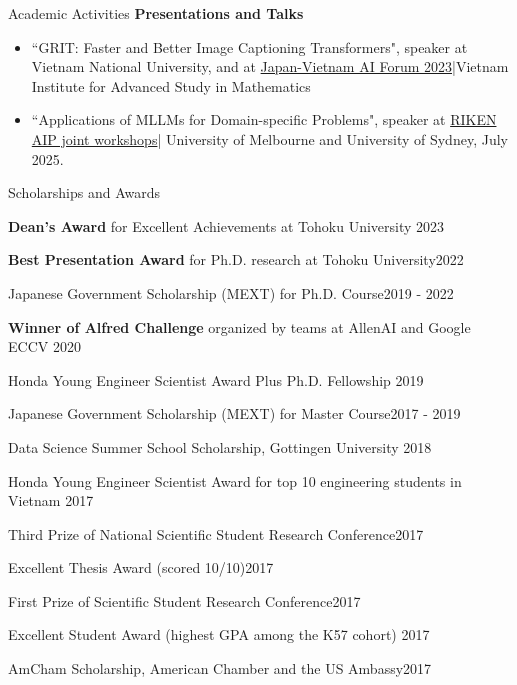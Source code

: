 \documentclass{resume} %
\begin{document}
\begin{rSection}{Academic Activities}
{\large \bf Presentations and Talks}
\begin{itemize}
    \item ``GRIT: Faster and Better Image Captioning Transformers", speaker at Vietnam National University, and at \href{https://viasm.edu.vn/en/hdkh/jvaif}{Japan-Vietnam AI Forum 2023}|Vietnam Institute for Advanced Study in Mathematics
    \item ``Applications of MLLMs for Domain-specific Problems", speaker at \href{https://sites.google.com/view/rikenaipjointworkshopsjuly2025}{RIKEN AIP joint workshops}|  University of Melbourne and University of Sydney, July 2025.
    
\end{itemize}
\end{rSection}

\begin{rSection}{Scholarships and Awards}
	\begin{enumerate}
	\item {\textbf{Dean's Award} for Excellent Achievements} at Tohoku University \hfill {2023}
	\item {\textbf{Best Presentation Award} for Ph.D. research at Tohoku University}\hfill {2022}
        \item {Japanese Government Scholarship (MEXT) for Ph.D. Course}\hfill {2019 - 2022}
        \item \textbf{Winner of Alfred Challenge} organized by teams at AllenAI and Google \hfill {ECCV 2020}
		\item {Honda Young Engineer Scientist Award Plus Ph.D. Fellowship} \hfill {2019}
        \item {Japanese Government Scholarship (MEXT) for Master Course}\hfill {2017 - 2019}
		\item {Data Science Summer School Scholarship, Gottingen University} \hfill {2018}
		\item {Honda Young Engineer Scientist Award for top 10 engineering students in Vietnam} \hfill {2017}
		\item {Third Prize of National Scientific Student Research Conference}\hfill {2017}
		\item {Excellent Thesis Award (scored 10/10)}\hfill {2017}
		\item {First Prize of Scientific Student Research Conference}\hfill {2017}
		\item {Excellent Student Award ({{highest GPA among the K57 cohort})} \hfill {2017}
		\item {AmCham Scholarship, American Chamber and the US Ambassy}\hfill {2017}
}
\end{enumerate}
\end{rSection}
\end{document}
